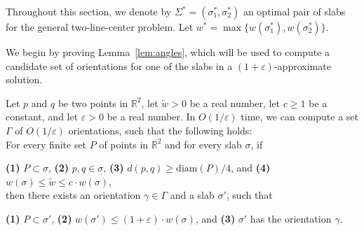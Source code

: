 \documentclass[english,a4paper, cleveref, autoref, thm-restate, nolineno]{socg-lipics-v2021}
\theoremstyle{star}
\theoremstyle{claimstar}
\newcommand{\eps}{\ensuremath{\varepsilon}}
\newcommand{\mytxt}[1]{\textup{\textbf{\textsf{\textcolor{lipicsGray}{#1}}}}}
\newcommand{\diam}{\ensuremath{\mathrm{diam}}}
\begin{document}
Throughout this section, we denote by $\Sigma^* = (\sigma_1^*, \sigma_2^*)$ an optimal pair of slabs for the general two-line-center problem. Let $w^* = \max \{w(\sigma_1^*), w(\sigma_2^*) \}$.


We begin by proving Lemma~\ref{lem:angles}, which will be used to compute a candidate set of orientations for one of the slabs in a $(1+\eps)$-approximate solution.



\begin{lemma}
    \label{lem:angles}
    Let $p$ and $q$ be two points in $\mathbb R^2$, let $\widetilde w > 0$ be  a real number, let $c\ge 1$ be a constant, and let $\eps> 0$ be a real number.
    In $O(1/\eps)$ time, we can compute a set $\Gamma$ of $O(1/\eps)$ orientations, such that the following holds:\\
    For every finite set $P$ of points in $\mathbb R^2$ and for every slab $\sigma$, if 
    
    \mytxt{(1)} $P\subset \sigma$, 
    \mytxt{(2)} $p, q \in \sigma$, 
    \mytxt{(3)} $d(p,q) \ge \diam(P)/4$, and
    \mytxt{(4)} $w(\sigma) \le \widetilde w \le c\cdot w(\sigma)$,
    \\then there exists an orientation $\gamma\in \Gamma$ and a slab $\sigma'$, such that
    
    \mytxt{(1)} $P \subset \sigma'$, 
    \mytxt{(2)} $w(\sigma') \le (1+ \eps) \cdot w(\sigma)$, and
    \mytxt{(3)} $\sigma'$ has the orientation $\gamma$.
\end{lemma}
\end{document}
